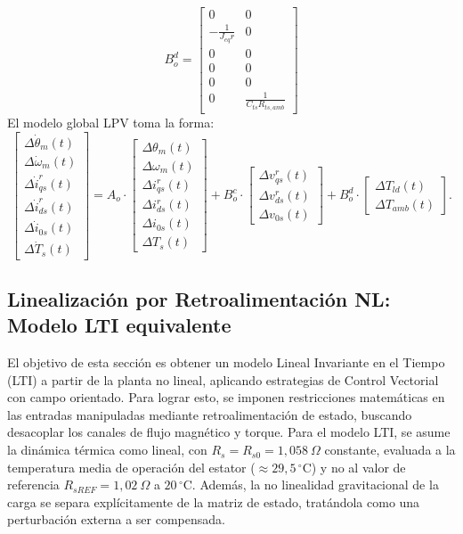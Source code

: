 \documentclass[12pt, a4paper,journal, onecolumn, compsoc]{IEEEtran}
\begin{document}
\begin{equation*}
B_o^d = \begin{bmatrix}
0 & 0 \\
-\frac{1}{J_{eq} r} & 0 \\
0 & 0 \\
0 & 0 \\
0 & 0 \\
0 & \frac{1}{C_{ts} R_{ts,amb}}
\end{bmatrix} 
\end{equation*}
El modelo global LPV toma la forma:
\begin{equation}
\begin{bmatrix}
\Delta \dot{\theta}_m(t) \\
\Delta \dot{\omega}_m(t) \\
\Delta \dot{i}_{qs}^r(t) \\
\Delta \dot{i}_{ds}^r(t) \\
\Delta \dot{i}_{0s}(t) \\
\Delta \dot{T}_s(t)
\end{bmatrix} = A_o \cdot 
\begin{bmatrix}
\Delta \theta_m(t) \\
\Delta \omega_m(t) \\
\Delta i_{qs}^r(t) \\
\Delta i_{ds}^r(t) \\
\Delta i_{0s}(t) \\
\Delta T_s(t)
\end{bmatrix} + B_o^c \cdot 
\begin{bmatrix}
\Delta v_{qs}^r(t) \\
\Delta v_{ds}^r(t) \\
\Delta v_{0s}(t)
\end{bmatrix} + B_o^d \cdot 
\begin{bmatrix}
\Delta T_{ld}(t) \\
\Delta T_{amb}(t)
\end{bmatrix} .
\end{equation}


\subsection{Linealización por Retroalimentación NL: Modelo LTI equivalente}
El objetivo de esta sección es obtener un modelo Lineal Invariante en el Tiempo (LTI) a partir de la planta no lineal, aplicando estrategias de Control Vectorial con campo orientado. Para lograr esto, se imponen restricciones matemáticas en las entradas manipuladas mediante retroalimentación de estado, buscando desacoplar los canales de flujo magnético y torque. Para el modelo LTI, se asume la dinámica térmica como lineal, con $R_s = R_{s0} = 1{,}058\ \Omega$ constante, evaluada a la temperatura media de operación del estator ($\approx 29{,}5\,^\circ$C) y no al valor de referencia $R_{sREF} = 1{,}02\ \Omega$ a $20\,^\circ$C. Además, la no linealidad gravitacional de la carga se separa explícitamente de la matriz de estado, tratándola como una perturbación externa a ser compensada.
\end{document}
